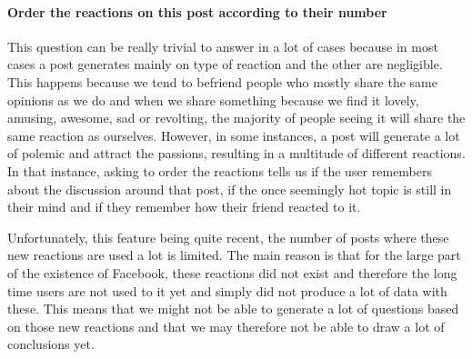 \paragraph{Order the reactions on this post according to their number}
This question can be really trivial to answer in a lot of cases because in most cases a post generates mainly on type of reaction and the other are negligible. This happens because we tend to befriend people who mostly share the same opinions as we do and when we share something because we find it lovely, amusing, awesome, sad or revolting, the majority of people seeing it will share the same reaction as ourselves. However, in some instances, a post will generate a lot of polemic and attract the passions, resulting in a multitude of different reactions. In that instance, asking to order the reactions tells us if the user remembers about the discussion around that post, if the once seemingly hot topic is still in their mind and if they remember how their friend reacted to it.

Unfortunately, this feature being quite recent, the number of posts where these new reactions are used a lot is limited. The main reason is that for the large part of the existence of Facebook, these reactions did not exist and therefore the long time users are not used to it yet and simply did not produce a lot of data with these. This means that we might not be able to generate a lot of questions based on those new reactions and that we may therefore not be able to draw a lot of conclusions yet.
